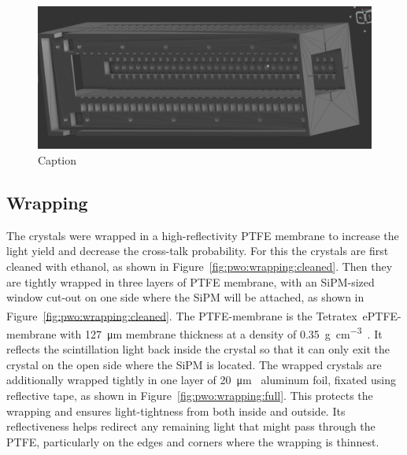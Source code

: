\begin{figure}[h]
    \centering
    \includegraphics[width=0.5\linewidth]{fig/pbwo4Detector/housingSTL.png}
    \caption{Caption}
    \label{fig:enter-label}
\end{figure}

\subsection{Wrapping}
The crystals were wrapped in a high-reflectivity PTFE membrane to increase the light yield and decrease the cross-talk probability.
For this the crystals are first cleaned with ethanol, as shown in Figure~\ref{fig:pwo:wrapping:cleaned}.
Then they are tightly wrapped in three layers of PTFE membrane, with an \gls{SiPM}-sized window cut-out on one side where the SiPM will be attached, as shown in Figure~\ref{fig:pwo:wrapping:cleaned}.
The PTFE-membrane is the Tetratex\textsuperscript{{\textregistered}}~ePTFE-membrane with \SI{127}{\micro\meter} membrane thickness at a density of \SI{0.35}{\gram\per\centi\meter^3}~\cite{rene}. %
It reflects the scintillation light back inside the crystal so that it can only exit the crystal on the open side where the SiPM is located.
The wrapped crystals are additionally wrapped tightly in one layer of \SI{20}{\micro\meter}~\cite{rene} aluminum foil, fixated using reflective tape, as shown in Figure~\ref{fig:pwo:wrapping:full}.
This protects the wrapping and ensures light-tightness from both inside and outside.
Its reflectiveness helps redirect any remaining light that might pass through the PTFE, particularly on the edges and corners where the wrapping is thinnest.

\begin{figure}[h]
    \centering        
    \hspace{0.02\textwidth}
    \\
\end{figure}
 
